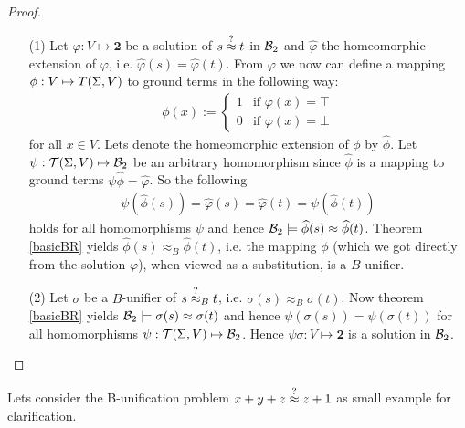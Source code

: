 		\begin{proof}\mbox{}
		\begin{itemize}
		\item[(1)]Let $\varphi:V\mapsto\textbf{2}$ be a solution of $s\stackrel{?}{\approx} t$ in ${\mathcal{B}_2}$ and $\widehat{\varphi}$ the homeomorphic extension of $\varphi$, i.e. $\widehat{\varphi}(s)=\widehat{\varphi}(t)$. From $\varphi$ we now can define a mapping $\phi:V\mapsto T(\Sigma,V)$ to ground terms in the following way:
		\begin{align*}
		\phi(x):=\begin{cases}
		1 & \text{if }\varphi(x)=\top\\
		0 & \text{if }\varphi(x)=\bot
		\end{cases}
		\end{align*}
		for all $x\in V$. Lets denote the homeomorphic extension of $\phi$ by $\widehat{\phi}$. Let $\psi:\mathcal{T}(\Sigma,V)\mapsto{\mathcal{B}_2}$ be an arbitrary homomorphism since $\widehat{\phi}$ is a mapping to ground terms $\psi\widehat{\phi}=\widehat{\varphi}$. So the following
		\begin{align*}
		\psi\left( \widehat{\phi}(s)\right)=\widehat{\varphi}(s)=\widehat{\varphi}(t)=\psi\left( \widehat{\phi}(t)\right) 
		\end{align*}
		holds for all homomorphisms $\psi$ and hence ${\mathcal{B}_2}\models\widehat{\phi}(s)\approx\widehat{\phi}(t)$. Theorem \ref{basicBR} yields $\widehat{\phi}(s)\approx_B\widehat{\phi}(t)$, i.e. the mapping $\phi$ (which we got directly from the solution $\varphi$), when viewed as a substitution, is a $B$-unifier.
		\item[(2)] Let $\sigma$ be a $B$-unifier of $s\stackrel{?}{\approx}_B t$, i.e. $\sigma(s)\approx_B\sigma(t)$. Now theorem \ref{basicBR} yields ${\mathcal{B}_2}\models\sigma(s)\approx\sigma(t)$ and hence $\psi\left(\sigma (s)\right)=\psi\left(\sigma (t)\right)$ for all homomorphisms $\psi:\mathcal{T}(\Sigma,V)\mapsto{\mathcal{B}_2}$. Hence $\psi\sigma:V\mapsto\textbf{2}$ is a solution in ${\mathcal{B}_2}$.
		\end{itemize}
		\end{proof}
		Lets consider the B-unification problem $x+y+z\stackrel{?}{\approx} z+1$ as small example for clarification.
